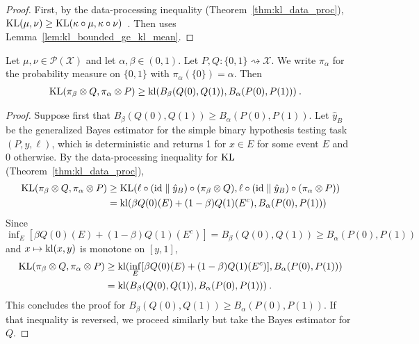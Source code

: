 \begin{proof}%
{}
First, by the data-processing inequality (Theorem~\ref{thm:kl_data_proc}),
$\operatorname{KL}(\mu, \nu) \ge \operatorname{KL}(\kappa \circ \mu, \kappa \circ \nu)$~.
Then uses Lemma~\ref{lem:kl_bounded_ge_kl_mean}.
\end{proof}


\begin{lemma}
  \label{lem:kl_estimation_ge}
  Let $\mu, \nu \in \mathcal P(\mathcal X)$ and let $\alpha, \beta \in (0, 1)$. Let $P, Q : \{0,1\} \rightsquigarrow \mathcal X$. We write $\pi_\alpha$ for the probability measure on $\{0,1\}$ with $\pi_\alpha(\{0\}) = \alpha$. Then
  \begin{align*}
  \operatorname{KL}(\pi_\beta \otimes Q, \pi_\alpha \otimes P)
  &\ge \operatorname{kl}(B_\beta(Q(0), Q(1)), B_\alpha(P(0), P(1)))
  \: .
  \end{align*}
\end{lemma}

\begin{proof}%
{}
Suppose first that $B_\beta(Q(0), Q(1)) \ge B_\alpha(P(0), P(1))$.
Let $\hat{y}_B$ be the generalized Bayes estimator for the simple binary hypothesis testing task $(P, y, \ell)$, which is deterministic and returns 1 for $x \in E$ for some event $E$ and 0 otherwise. By the data-processing inequality for $\operatorname{KL}$ (Theorem~\ref{thm:kl_data_proc}),
\begin{align*}
\operatorname{KL}(\pi_\beta \otimes Q, \pi_\alpha \otimes P)
&\ge \operatorname{KL}(\ell \circ (\mathrm{id} \parallel \hat{y}_B) \circ (\pi_\beta \otimes Q), \ell \circ (\mathrm{id} \parallel \hat{y}_B) \circ (\pi_\alpha \otimes P))
\\
&= \operatorname{kl}(\beta Q(0)(E) + (1 - \beta) Q(1)(E^c), B_\alpha(P(0), P(1)))
\end{align*}
Since $\inf_{E} [\beta Q(0)(E) + (1 - \beta) Q(1)(E^c)] = B_\beta(Q(0), Q(1)) \ge B_\alpha(P(0), P(1))$ and $x \mapsto \operatorname{kl}(x, y)$ is monotone on $[y, 1]$,
\begin{align*}
\operatorname{KL}(\pi_\beta \otimes Q, \pi_\alpha \otimes P)
&\ge \operatorname{kl}(\inf_{E} [\beta Q(0)(E) + (1 - \beta) Q(1)(E^c)], B_\alpha(P(0), P(1)))
\\
&= \operatorname{kl}(B_\beta(Q(0), Q(1)), B_\alpha(P(0), P(1)))
\: .
\end{align*}
This concludes the proof for $B_\beta(Q(0), Q(1)) \ge B_\alpha(P(0), P(1))$. If that inequality is reversed, we proceed similarly but take the Bayes estimator for $Q$.
\end{proof}


